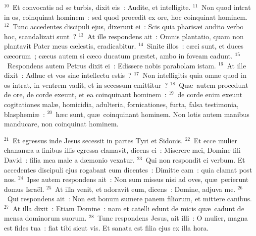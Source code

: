 ${}^{10}$~Et convocatis ad se turbis, dixit eis~: Audite, et intelligite.
${}^{11}$~Non quod intrat in os, coinquinat hominem~: sed quod procedit ex ore, hoc coinquinat hominem.
${}^{12}$~Tunc accedentes discipuli ejus, dixerunt ei~: Scis quia pharis\ae i audito verbo hoc, scandalizati sunt~?
${}^{13}$~At ille respondens ait~: Omnis plantatio, quam non plantavit Pater meus c\ae lestis, eradicabitur.
${}^{14}$~Sinite illos~: c\ae ci sunt, et duces c\ae corum~; c\ae cus autem si c\ae co ducatum pr\ae stet, ambo in foveam cadunt.
${}^{15}$~Respondens autem Petrus dixit ei~: Edissere nobis parabolam istam.
${}^{16}$~At ille dixit~: Adhuc et vos sine intellectu estis~?
${}^{17}$~Non intelligitis quia omne quod in os intrat, in ventrem vadit, et in secessum emittitur~?
${}^{18}$~Qu\ae\ autem procedunt de ore, de corde exeunt, et ea coinquinant hominem~:
${}^{19}$~de corde enim exeunt cogitationes mal\ae , homicidia, adulteria, fornicationes, furta, falsa testimonia, blasphemi\ae~:
${}^{20}$~h\ae c sunt, qu\ae\ coinquinant hominem. Non lotis autem manibus manducare, non coinquinat hominem.


${}^{21}$~Et egressus inde Jesus secessit in partes Tyri et Sidonis.
${}^{22}$~Et ecce mulier chanan\ae a a finibus illis egressa clamavit, dicens ei~: Miserere mei, Domine fili David~: filia mea male a d\ae monio vexatur.
${}^{23}$~Qui non respondit ei verbum. Et accedentes discipuli ejus rogabant eum dicentes~: Dimitte eam~: quia clamat post nos.
${}^{24}$~Ipse autem respondens ait~: Non sum missus nisi ad oves, qu\ae\ perierunt domus Isra\"el.
${}^{25}$~At illa venit, et adoravit eum, dicens~: Domine, adjuva me.
${}^{26}$~Qui respondens ait~: Non est bonum sumere panem filiorum, et mittere canibus.
${}^{27}$~At illa dixit~: Etiam Domine~: nam et catelli edunt de micis qu\ae\ cadunt de mensa dominorum suorum.
${}^{28}$~Tunc respondens Jesus, ait illi~: O mulier, magna est fides tua~: fiat tibi sicut vis. Et sanata est filia ejus ex illa hora.


